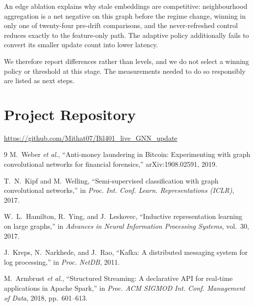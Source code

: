 \documentclass[conference]{IEEEtran}
\begin{document}
An edge ablation explains why stale embeddings are competitive: neighbourhood
aggregation is a net negative on this graph before the regime change, winning
in only one of twenty-four pre-drift comparisons, and the never-refreshed
control reduces exactly to the feature-only path. The adaptive policy
additionally fails to convert its smaller update count into lower latency.

We therefore report differences rather than levels, and we do not select a
winning policy or threshold at this stage. The measurements needed to do so
responsibly are listed as next steps.

\section*{Project Repository}
\url{https://github.com/Mithat07/Bil401_live_GNN_update}

\begin{thebibliography}{9}
M.~Weber \emph{et al.}, ``Anti-money laundering in Bitcoin: Experimenting with
graph convolutional networks for financial forensics,''
arXiv:1908.02591, 2019.

T.~N.~Kipf and M.~Welling, ``Semi-supervised classification with graph
convolutional networks,'' in \emph{Proc. Int. Conf. Learn. Representations
(ICLR)}, 2017.

W.~L.~Hamilton, R.~Ying, and J.~Leskovec, ``Inductive representation learning
on large graphs,'' in \emph{Advances in Neural Information Processing Systems},
vol.~30, 2017.

J.~Kreps, N.~Narkhede, and J.~Rao, ``Kafka: A distributed messaging system for
log processing,'' in \emph{Proc. NetDB}, 2011.

M.~Armbrust \emph{et al.}, ``Structured Streaming: A declarative API for
real-time applications in Apache Spark,'' in \emph{Proc. ACM SIGMOD Int. Conf.
Management of Data}, 2018, pp.~601--613.
\end{thebibliography}
\end{document}
